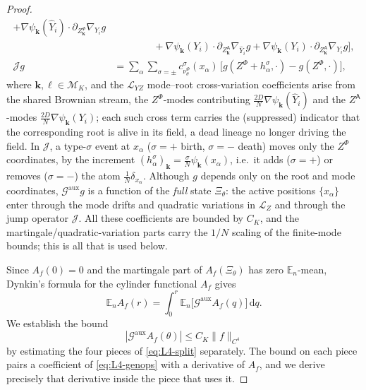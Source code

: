 \documentclass[a4paper,fleqn]{cas-sc}
\theoremstyle{definition}
\theoremstyle{remark}
\begin{document}
\begin{proof}
\begin{equation}
\begin{aligned}
+\nabla\psi_{\mathbf k}(\widehat Y_i)\!\cdot\!\partial_{Z^\Phi_{\mathbf k}}\nabla_{Y_i}g\\
&\qquad\qquad+\nabla\psi_{\mathbf k}(Y_i)\!\cdot\!\partial_{Z^{\mathsf A}_{\mathbf k}}\nabla_{\widehat Y_i}g
+\nabla\psi_{\mathbf k}(Y_i)\!\cdot\!\partial_{Z^{\mathsf A}_{\mathbf k}}\nabla_{Y_i}g\Bigr],\\
\mathcal Jg&=\sum_{\alpha}\sum_{\sigma=\pm}c^\sigma_{\nu^\Phi_\theta}(x_\alpha)\,
\bigl[g(Z^\Phi+h^\sigma_\alpha,\cdot)-g(Z^\Phi,\cdot)\bigr],
\end{aligned}
\end{equation}
where $\mathbf k,\ell\in\mathcal M_K$, and the $\mathcal L_{YZ}$ mode--root
cross-variation coefficients arise from the shared Brownian stream, the $Z^\Phi$-modes
contributing $\tfrac{2D}N\nabla\psi_{\mathbf k}(\widehat Y_i)$ and the $Z^{\mathsf A}$-modes
$\tfrac{2D}N\nabla\psi_{\mathbf k}(Y_i)$; each such cross term carries the (suppressed) indicator
that the corresponding root is alive in its field, a dead lineage no longer driving the field. In
$\mathcal J$, a type-$\sigma$ event at $x_\alpha$
($\sigma=+$ birth, $\sigma=-$ death) moves only the $Z^\Phi$ coordinates, by the increment
$(h^\sigma_\alpha)_{\mathbf k}=\tfrac{\sigma}N\psi_{\mathbf k}(x_\alpha)$, i.e.\ it adds
($\sigma=+$) or removes ($\sigma=-$) the atom $\tfrac1N\delta_{x_\alpha}$.
Although $g$ depends only on the root and mode coordinates, $\mathcal G^{\mathrm{aux}}g$ is
a function of the \emph{full} state $\Xi_\theta$: the active positions $\{x_\alpha\}$ enter
through the mode drifts and quadratic variations in $\mathcal L_Z$ and through the jump
operator $\mathcal J$. All these coefficients are bounded by $C_K$, and the
martingale/quadratic-variation parts carry the $1/N$ scaling of the finite-mode bounds;
this is all that is used below.

Since $A_f(0)=0$ and the martingale part of $A_f(\Xi_\theta)$ has zero $\mathbb E_n$-mean,
Dynkin's formula for the cylinder functional $A_f$ gives
\begin{equation}\label{eq:L4-dynkin}
\mathbb E_nA_f(r)=\int_0^r\mathbb E_n\bigl[\mathcal G^{\mathrm{aux}}A_f(q)\bigr]\,\mathrm dq.
\end{equation}
We establish the bound
\begin{equation}\label{eq:L4-gen}
|\mathcal G^{\mathrm{aux}}A_f(\theta)|\le C_K\|f\|_{C^4}
\end{equation}
by estimating the four pieces of \eqref{eq:L4-split} separately. The bound on each piece pairs a
coefficient of \eqref{eq:L4-genops} with a derivative of $A_f$, and we derive precisely that
derivative inside the piece that uses it.


\end{proof}
\end{document}
